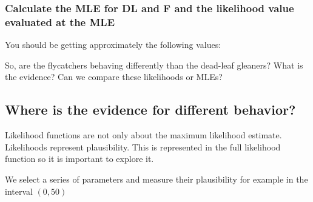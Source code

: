 \documentclass[
]{book}
\newenvironment{Shaded}{\begin{snugshade}}{\end{snugshade}}
\newcommand{\AttributeTok}[1]{\textcolor[rgb]{0.77,0.63,0.00}{#1}}
\newcommand{\DecValTok}[1]{\textcolor[rgb]{0.00,0.00,0.81}{#1}}
\newcommand{\FunctionTok}[1]{\textcolor[rgb]{0.00,0.00,0.00}{#1}}
\newcommand{\NormalTok}[1]{#1}
\newcommand{\OtherTok}[1]{\textcolor[rgb]{0.56,0.35,0.01}{#1}}
\newcommand{\SpecialCharTok}[1]{\textcolor[rgb]{0.00,0.00,0.00}{#1}}
\begin{document}
\hypertarget{calculate-the-mle-for-dl-and-f-and-the-likelihood-value-evaluated-at-the-mle}{%
\subsubsection{Calculate the MLE for DL and F and the likelihood value evaluated at the MLE}\label{calculate-the-mle-for-dl-and-f-and-the-likelihood-value-evaluated-at-the-mle}}

You should be getting approximately the following values:

\begin{Shaded}
\end{Shaded}

So, are the flycatchers behaving differently than the dead-leaf gleaners? What is the evidence? Can we compare these likelihoods or MLEs?

\hypertarget{where-is-the-evidence-for-different-behavior}{%
\subsection{Where is the evidence for different behavior?}\label{where-is-the-evidence-for-different-behavior}}

Likelihood functions are not only about the maximum likelihood estimate. Likelihoods represent plausibility. This is represented in the full likelihood function so it is important to explore it.

We select a series of parameters and measure their plausibility for example in the interval \((0,50)\)
\end{document}
